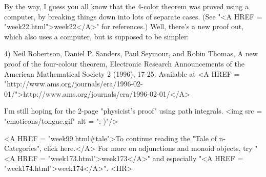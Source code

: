 By the way, I guess you all know that the 4-color theorem was proved 
using a computer, by breaking things down into lots of separate cases.  
(See "<A HREF = "week22.html">week22</A>" for references.)  Well, there's a new proof out, which also 
uses a computer, but is supposed to be simpler:

4) Neil Robertson, Daniel P. Sanders, Paul Seymour, and Robin Thomas,
A new proof of the four-colour theorem, Electronic Research Announcements
of the American Mathematical Society 2 (1996), 17-25.  Available at
<A HREF = "http://www.ams.org/journals/era/1996-02-01/">http://www.ams.org/journals/era/1996-02-01/</A>

I'm still hoping for the 2-page "physicist's proof" using 
path integrals.  <img src = "emoticons/tongue.gif" alt = ":-)"/>

<A HREF = "week99.html#tale">To continue reading the "Tale of
n-Categories", click here.</A>
For more on adjunctions and monoid objects, try "<A HREF =
"week173.html">week173</A>" and especially
"<A HREF = "week174.html">week174</A>".
<HR>



